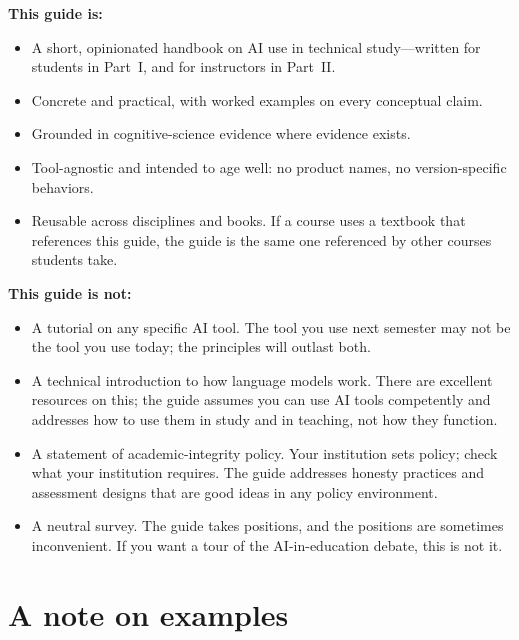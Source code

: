 \documentclass[11pt]{book}
\begin{document}
\noindent \textbf{This guide is:}

\begin{itemize}\setlength{\itemsep}{2pt}
\item A short, opinionated handbook on AI use in technical study---written for students in Part~I, and for instructors in Part~II.
\item Concrete and practical, with worked examples on every conceptual claim.
\item Grounded in cognitive-science evidence where evidence exists.
\item Tool-agnostic and intended to age well: no product names, no version-specific behaviors.
\item Reusable across disciplines and books. If a course uses a textbook that references this guide, the guide is the same one referenced by other courses students take.
\end{itemize}

\medskip

\noindent \textbf{This guide is not:}

\begin{itemize}\setlength{\itemsep}{2pt}
\item A tutorial on any specific AI tool. The tool you use next semester may not be the tool you use today; the principles will outlast both.
\item A technical introduction to how language models work. There are excellent resources on this; the guide assumes you can use AI tools competently and addresses how to use them in study and in teaching, not how they function.
\item A statement of academic-integrity policy. Your institution sets policy; check what your institution requires. The guide addresses honesty practices and assessment designs that are good ideas in any policy environment.
\item A neutral survey. The guide takes positions, and the positions are sometimes inconvenient. If you want a tour of the AI-in-education debate, this is not it.
\end{itemize}

\chapter*{A note on examples}
\end{document}
